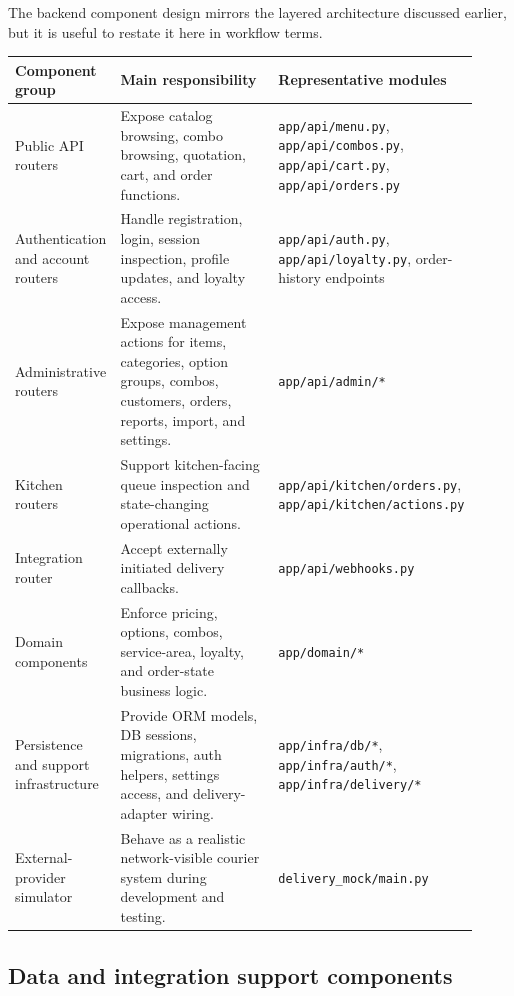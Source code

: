 The backend component design mirrors the layered architecture discussed earlier, but it is useful to restate it here in workflow terms.

\begingroup
\small
\setlength{\LTpre}{0.4em}
\setlength{\LTpost}{0.8em}
\label{tab:backend-components}
\begin{tabular}{L{0.19\linewidth} L{0.34\linewidth} L{0.39\linewidth}}
\toprule
\textbf{Component group} & \textbf{Main responsibility} & \textbf{Representative modules} \\
\midrule
Public API routers & Expose catalog browsing, combo browsing, quotation, cart, and order functions. & \texttt{app/api/menu.py}, \texttt{app/api/combos.py}, \texttt{app/api/cart.py}, \texttt{app/api/orders.py} \\
Authentication and account routers & Handle registration, login, session inspection, profile updates, and loyalty access. & \texttt{app/api/auth.py}, \texttt{app/api/loyalty.py}, order-history endpoints \\
Administrative routers & Expose management actions for items, categories, option groups, combos, customers, orders, reports, import, and settings. & \texttt{app/api/admin/*} \\
Kitchen routers & Support kitchen-facing queue inspection and state-changing operational actions. & \texttt{app/api/kitchen/orders.py}, \texttt{app/api/kitchen/actions.py} \\
Integration router & Accept externally initiated delivery callbacks. & \texttt{app/api/webhooks.py} \\
Domain components & Enforce pricing, options, combos, service-area, loyalty, and order-state business logic. & \texttt{app/domain/*} \\
Persistence and support infrastructure & Provide ORM models, DB sessions, migrations, auth helpers, settings access, and delivery-adapter wiring. & \texttt{app/infra/db/*}, \texttt{app/infra/auth/*}, \texttt{app/infra/delivery/*} \\
External-provider simulator & Behave as a realistic network-visible courier system during development and testing. & \texttt{delivery\_mock/main.py} \\
\bottomrule
\end{tabular}
\endgroup

\subsection{Data and integration support components}

